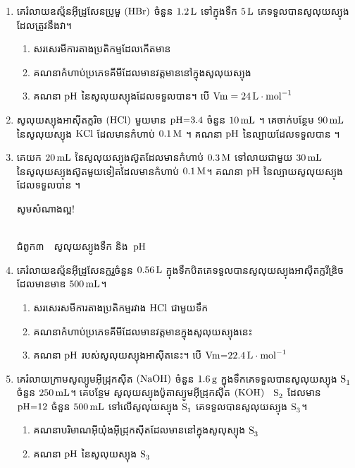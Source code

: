 \documentclass[12pt, a4paper]{article}
\begin{document}
\begin{enumerate}[m]
	\item គេរំលាយឧស្ម័នអុីដ្រូសែនប្រូមួ $\ce{(HBr)}$ ចំនួន $\ce{1.2L}$ ទៅក្នុងទឹក $\ce{5L}$ គេទទួលបានសូលុយស្យុងដែលត្រូវនឹងវា។
	\begin{enumerate}[k]
		\item សរសេរមីការតាងប្រតិកម្មដែលកើតមាន
		\item គណនាកំហាប់ប្រភេទគីមីដែលមានវត្តមាននៅក្នុងសូលុយស្យុង
		\item គណនា $\ce{pH}$ នៃសូលុយស្យុងដែលទទួលបាន។ បើ $\ce{Vm = 24L\cdot mol^{-1}}$
	\end{enumerate}
	\item សូលុយស្យុងអាសុីតក្លរិច $\ce{(HCl)}$ មួយមាន $\ce{pH=3.4}$ ចំនួន $\ce{10mL}$ ។ គេចាក់បន្ថែម $\ce{90mL}$ នៃសូលុយស្យុង $\ce{KCl}$ ដែលមានកំហាប់ $\ce{0.1M}$ ។ គណនា $\ce{pH}$ នៃល្បាយដែលទទួលបាន ។
	\item គេយក $\ce{20mL}$ នៃសូលុយស្យុងស៊ូតដែលមានកំហាប់ $\ce{0.3M}$ ទៅលាយជាមួយ $\ce{30mL}$ នៃសូលុយស្យុងស៊ូតមួយទៀតដែលមានកំហាប់ $\ce{0.1M}$។ គណនា $\ce{pH}$ នៃល្បាយសូលុយស្យុងដែលទទួលបាន ។
	\begin{center}
		\sffamily\color{black}
		សូមសំណាងល្អ!
	\end{center}\newpage
	\begin{center}
		\sffamily\color{black}
		\\
		ជំពូក៣~~សូលុយស្យូងទឹក និង~$\ce{pH}$
	\end{center}
	\item គេរំលាយឧស្ម័នអុីដ្រូសែនក្លរួចំនួន $\ce{0.56L}$ ក្នុងទឹកបិតគេទទួលបានសូលុយស្យុងអាសុីតក្លរីឌ្រិចដែលមានមាឌ $\ce{500mL}$។
	\begin{enumerate}[k]
		\item សរសេរសមីការតាងប្រតិកម្មរវាង $\ce{HCl}$ ជាមួយទឹក 
		\item គណនាកំហាប់ប្រភេទគីមីដែលមានវត្តមានក្នុងសូលុយស្យុងនេះ
		\item គណនា $\ce{pH}$ របស់សូលុយស្យុងអាសុីតនេះ។ បើ $\ce{Vm=22.4L\cdot mol^{-1}}$
	\end{enumerate}
	\item គេរំលាយក្រាមសូល្យូមអុីដ្រុកសុីត $\ce{(NaOH)}$ ចំនួន $\ce{1.6g}$ ក្នុងទឹកគេទទួលបានសូលុយស្យុង $\ce{S1}$ ចំនួន $\ce{250mL}$។ គេបន្ថែម សូលុយស្យុងប៉ូតាស្យូមអុីដ្រុកសុីត $\ce{(KOH)}$~ $\ce{S2}$ ដែលមាន $\ce{pH=12}$ ចំនួន $\ce{500mL}$ ទៅលើសូលុយស្យុង $\ce{S1}$ គេទទួលបានសូលុយស្យុង $\ce{S3}$។
	\begin{enumerate}[k]
		\item គណនាបរិមាណអុីយ៉ុងអុីដ្រុកសុីតដែលមាននៅក្នុងសូលុស្យុង $\ce{S3}$
		\item គណនា $\ce{pH}$ នៃសូលុយស្យុង $\ce{S3}$

\end{enumerate}
\end{enumerate}
\end{document}
